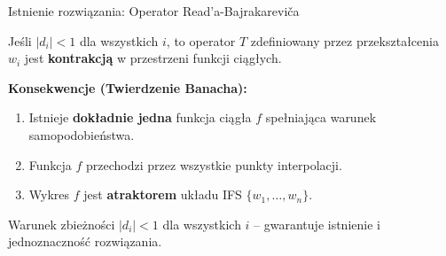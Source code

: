 \documentclass[10pt]{beamer}
\begin{document}
\begin{frame}{Istnienie rozwiązania: Operator Read'a-Bajrakareviča}
    \begin{theorem}
        Jeśli $|d_i| < 1$ dla wszystkich $i$, to operator $T$ zdefiniowany przez przekształcenia $w_i$ jest \textbf{kontrakcją} w przestrzeni funkcji ciągłych.
    \end{theorem}

    \vspace{0.3cm}
    \textbf{Konsekwencje (Twierdzenie Banacha):}
    \begin{enumerate}
        \item Istnieje \textbf{dokładnie jedna} funkcja ciągła $f$ spełniająca warunek samopodobieństwa.
        \item Funkcja $f$ przechodzi przez wszystkie punkty interpolacji.
        \item Wykres $f$ jest \textbf{atraktorem} układu IFS $\{w_1, \ldots, w_n\}$.
    \end{enumerate}

    \vspace{0.3cm}
    \begin{alertblock}{Warunek zbieżności}
        $|d_i| < 1$ dla wszystkich $i$ -- gwarantuje istnienie i jednoznaczność rozwiązania.
    \end{alertblock}
\end{frame}
\end{document}
